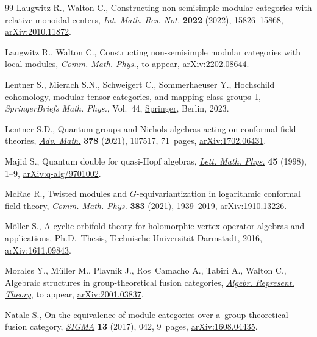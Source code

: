 \documentclass[10pt,a4paper]{amsart}
\numberwithin{equation}{section}
\begin{document}
\begin{thebibliography}{99}
Laugwitz R., Walton C., Constructing non-semisimple modular categories with
 relative monoidal centers, \href{https://doi.org/10.1093/imrn/rnab097}{\textit{Int. Math. Res. Not.}} \textbf{2022}
 (2022), 15826--15868, \href{https://arxiv.org/abs/2010.11872}{arXiv:2010.11872}.

Laugwitz R., Walton C., Constructing non-semisimple modular categories with
 local modules, \href{https://doi.org/10.1007/s00220-023-04824-4}{\textit{Comm. Math. Phys.}}, {t}o appear, \href{https://arxiv.org/abs/2202.08644}{arXiv:2202.08644}.

Lentner S., Mierach S.N., Schweigert C., Sommerhaeuser Y., Hochschild
 cohomology, modular tensor categories, and mapping class groups~{I},
 \textit{SpringerBriefs Math. Phys.}, Vol.~44, \href{https://doi.org/10.1007/978-981-19-4645-5}{Springer}, Berlin, 2023.

Lentner S.D., Quantum groups and {N}ichols algebras acting on conformal field
 theories, \href{https://doi.org/10.1016/j.aim.2020.107517}{\textit{Adv. Math.}} \textbf{378} (2021), 107517, 71~pages,
 \href{https://arxiv.org/abs/1702.06431}{arXiv:1702.06431}.

Majid S., Quantum double for quasi-{H}opf algebras, \href{https://doi.org/10.1023/A:1007450123281}{\textit{Lett. Math. Phys.}}
 \textbf{45} (1998), 1--9, \href{https://arxiv.org/abs/q-alg/9701002}{arXiv:q-alg/9701002}.

McRae R., Twisted modules and {$G$}-equivariantization in logarithmic conformal
 field theory, \href{https://doi.org/10.1007/s00220-020-03882-2}{\textit{Comm. Math. Phys.}} \textbf{383} (2021), 1939--2019,
 \href{https://arxiv.org/abs/1910.13226}{arXiv:1910.13226}.

M\"oller S., A cyclic orbifold theory for holomorphic vertex operator algebras
 and applications, Ph.D.~Thesis, {T}echnische Universit{\"a}t Darmstadt, 2016,
 \href{https://arxiv.org/abs/1611.09843}{arXiv:1611.09843}.

Morales Y., M\"uller M., Plavnik J., Ros~Camacho A., Tabiri A., Walton C.,
 Algebraic structures in group-theoretical fusion categories, \href{https://doi.org/10.1007/s10468-022-10186-7}{\textit{Algebr.
 Represent. Theory}}, {t}o appear, \href{https://arxiv.org/abs/2001.03837}{arXiv:2001.03837}.

Natale S., On the equivalence of module categories over a~group-theoretical
 fusion category, \href{https://doi.org/10.3842/SIGMA.2017.042}{\textit{SIGMA}} \textbf{13} (2017), 042, 9~pages,
 \href{https://arxiv.org/abs/1608.04435}{arXiv:1608.04435}.


\end{thebibliography}
\end{document}
